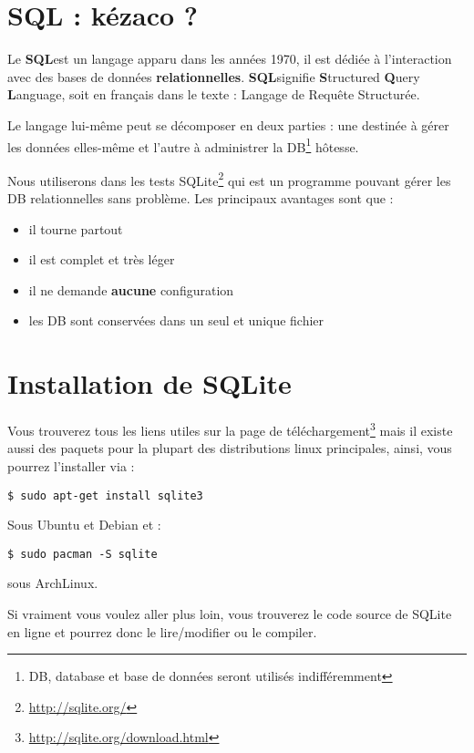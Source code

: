 \documentclass[a4paper, 11pt]{report}
\newcommand\SQL{{\bfseries SQL}}
\newcommand\http[1]{\footnote{\url{#1}}}
\begin{document}
\section{SQL : kézaco ?}

Le \SQL est un langage apparu dans les années 1970, il est dédiée à l'interaction avec des bases de données {\bfseries relationnelles}.
\SQL signifie {\bfseries S}tructured {\bfseries Q}uery {\bfseries L}anguage, soit en français dans le texte : Langage de Requête Structurée.

Le langage lui-même peut se décomposer en deux parties : une destinée à gérer les données elles-même et l'autre à administrer la DB\footnote{DB, database et base de données seront utilisés indifféremment} hôtesse.

Nous utiliserons dans les tests SQLite\http{http://sqlite.org/} qui est un programme pouvant gérer les DB relationnelles sans problème.
Les principaux avantages sont que :

\begin{itemize}
    \item il tourne partout
    \item il est complet et très léger
    \item il ne demande  {\bfseries aucune} configuration
    \item les DB sont conservées dans un seul et unique fichier
\end{itemize}
\section{Installation de SQLite}

Vous trouverez tous les liens utiles sur la page de téléchargement\http{http://sqlite.org/download.html} mais il existe aussi des paquets pour la plupart des distributions linux principales, ainsi, vous pourrez l'installer via :

\begin{verbatim}
$ sudo apt-get install sqlite3
\end{verbatim}

Sous Ubuntu et Debian et :

\begin{verbatim}
$ sudo pacman -S sqlite
\end{verbatim}

sous ArchLinux.

Si vraiment vous voulez aller plus loin, vous trouverez le code source de SQLite en ligne et pourrez donc le lire/modifier ou le compiler.
\end{document}
